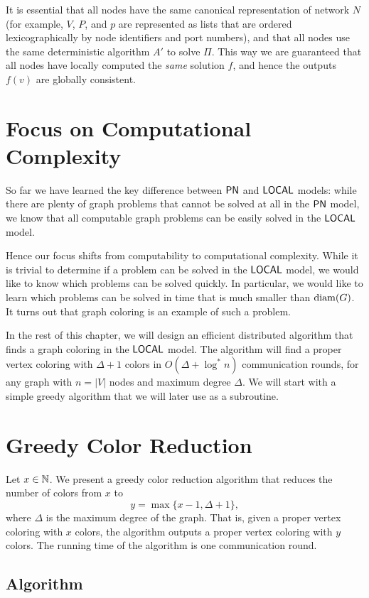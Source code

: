 It is essential that all nodes have the same canonical representation of network $N$ (for example, $V$, $P$, and $p$ are represented as lists that are ordered lexicographically by node identifiers and port numbers), and that all nodes use the same deterministic algorithm $A'$ to solve $\Pi$. This way we are guaranteed that all nodes have locally computed the \emph{same} solution $f$, and hence the outputs $f(v)$ are globally consistent.


\section{Focus on Computational Complexity}

So far we have learned the key difference between $\textup{\sffamily PN}$ and $\textup{\sffamily LOCAL}$ models: while there are plenty of graph problems that cannot be solved at all in the $\textup{\sffamily PN}$ model, we know that all computable graph problems can be easily solved in the $\textup{\sffamily LOCAL}$ model.

Hence our focus shifts from computability to computational complexity. While it is trivial to determine if a problem can be solved in the $\textup{\sffamily LOCAL}$ model, we would like to know which problems can be solved quickly. In particular, we would like to learn which problems can be solved in time that is much smaller than $\operatorname{diam}(G)$. It turns out that graph coloring is an example of such a problem.

In the rest of this chapter, we will design an efficient distributed algorithm that finds a graph coloring in the $\textup{\sffamily LOCAL}$ model. The algorithm will find a proper vertex coloring with $\Delta+1$ colors in $O(\Delta + \log^* n)$ communication rounds, for any graph with $n = |V|$ nodes and maximum degree $\Delta$. We will start with a simple greedy algorithm that we will later use as a subroutine.


\section{Greedy Color Reduction} \label{sec:bdgreedy}

Let $x \in \mathbb{N}$. We present a greedy color reduction algorithm that reduces the number of colors from $x$ to
\[
    y = \max \{ x-1, \Delta+1 \},
\]
where $\Delta$ is the maximum degree of the graph. That is, given a proper vertex coloring with $x$ colors, the algorithm outputs a proper vertex coloring with $y$ colors. The running time of the algorithm is one communication round.

\subsection{Algorithm}

